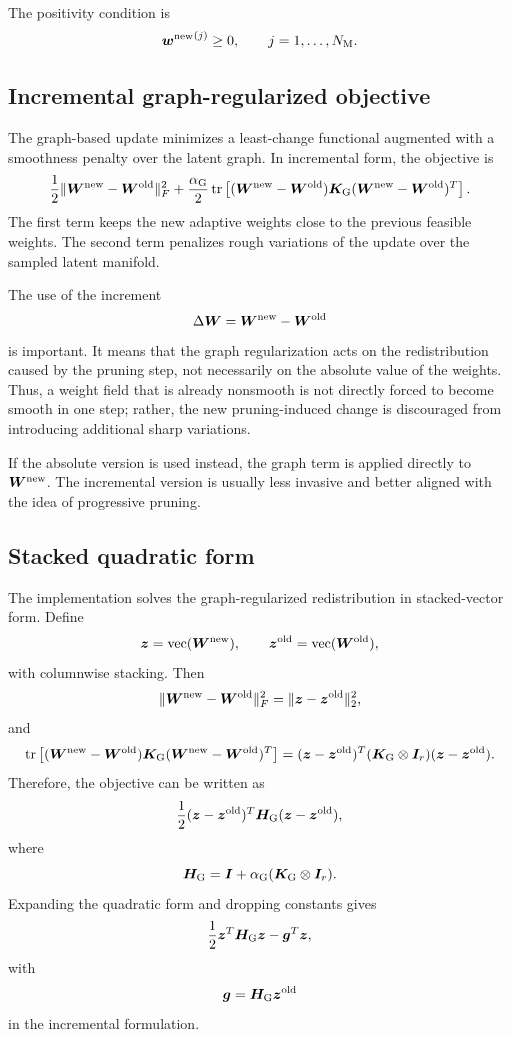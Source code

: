 \documentclass[11pt,a4paper]{article}
\begin{document}
The positivity condition is
\[
        {\bm w^{\mathrm{new}}}^{(j)}\geq 0,
        \qquad
        j=1,\ldots,N_{\mathrm{M}}.
        \label{eq:graph_positivity}
\]

\subsection{Incremental graph-regularized objective}

The graph-based update minimizes a least-change functional augmented with a
smoothness penalty over the latent graph. In incremental form, the objective is
\[
        \frac{1}{2}
        \|\bm W^{\mathrm{new}}-\bm W^{\mathrm{old}}\|_F^2
        +
        \frac{\alpha_{\mathrm{G}}}{2}
        \operatorname{tr}\left[
        (\bm W^{\mathrm{new}}-\bm W^{\mathrm{old}})
        \bm K_{\mathrm{G}}
        (\bm W^{\mathrm{new}}-\bm W^{\mathrm{old}})^T
        \right].
        \label{eq:graph_regularized_objective}
\]
The first term keeps the new adaptive weights close to the previous feasible
weights. The second term penalizes rough variations of the update over the
sampled latent manifold.

The use of the increment
\[
        \Delta \bm W=\bm W^{\mathrm{new}}-\bm W^{\mathrm{old}}
\]
is important. It means that the graph regularization acts on the redistribution
caused by the pruning step, not necessarily on the absolute value of the
weights. Thus, a weight field that is already nonsmooth is not directly forced
to become smooth in one step; rather, the new pruning-induced change is
discouraged from introducing additional sharp variations.

If the absolute version is used instead, the graph term is applied directly to
$\bm W^{\mathrm{new}}$. The incremental version is usually less invasive and better aligned
with the idea of progressive pruning.

\subsection{Stacked quadratic form}

The implementation solves the graph-regularized redistribution in stacked-vector
form. Define
\[
        \bm z=\operatorname{vec}(\bm W^{\mathrm{new}}),
        \qquad
        \bm z^{\mathrm{old}}=\operatorname{vec}(\bm W^{\mathrm{old}}),
\]
with columnwise stacking. Then
\[
        \|\bm W^{\mathrm{new}}-\bm W^{\mathrm{old}}\|_F^2
        =
        \|\bm z-\bm z^{\mathrm{old}}\|_2^2,
\]
and
\[
        \operatorname{tr}\left[
        (\bm W^{\mathrm{new}}-\bm W^{\mathrm{old}})\bm K_{\mathrm{G}}(\bm W^{\mathrm{new}}-\bm W^{\mathrm{old}})^T
        \right]
        =
        (\bm z-\bm z^{\mathrm{old}})^T
        (\bm K_{\mathrm{G}}\otimes\bm I_r)
        (\bm z-\bm z^{\mathrm{old}}).
\]
Therefore, the objective can be written as
\[
        \frac{1}{2}
        (\bm z-\bm z^{\mathrm{old}})^T
        \bm H_{\mathrm{G}}
        (\bm z-\bm z^{\mathrm{old}}),
        \label{eq:graph_stacked_incremental}
\]
where
\[
        \bm H_{\mathrm{G}}
        =
        \bm I
        +
        \alpha_{\mathrm{G}}
        (\bm K_{\mathrm{G}}\otimes\bm I_r).
        \label{eq:graph_hessian}
\]
Expanding the quadratic form and dropping constants gives
\[
        \frac{1}{2}\bm z^T\bm H_{\mathrm{G}}\bm z
        -
        \bm g^T\bm z,
        \label{eq:graph_quadratic_expanded}
\]
with
\[
        \bm g = \bm H_{\mathrm{G}}\bm z^{\mathrm{old}}
\]
in the incremental formulation.
\end{document}
